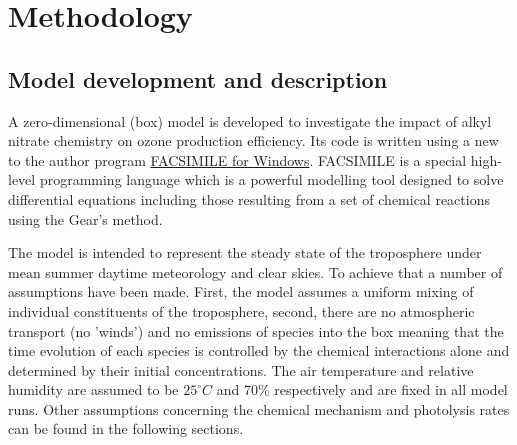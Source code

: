 \documentclass[11pt,a4paper]{article}
\begin{document}
\section{Methodology} \label{sec:method}
\subsection{Model development and description}\label{sec:method_develop}
A zero-dimensional (box) model is developed to investigate the impact of alkyl nitrate chemistry on ozone production efficiency. Its code is written using a new to the author program \href{http://www.mcpa-software.com/}{FACSIMILE for Windows}. FACSIMILE is a special high-level programming language which is a powerful modelling tool designed to solve differential equations including those resulting from a set of chemical reactions using the Gear’s method.

The model is intended to represent the steady state of the troposphere under mean summer daytime meteorology and clear skies. To achieve that a number of assumptions have been made. First, the model assumes a uniform mixing of individual constituents of the troposphere, second, there are no atmospheric transport (no 'winds') and no emissions of species into the box meaning that the time evolution of each species is controlled by the chemical interactions alone and determined by their initial concentrations. The air temperature and relative humidity are assumed to be $25^{\circ}C$ and 70\% respectively and are fixed in all model runs. Other assumptions concerning the chemical mechanism and photolysis rates can be found in the following sections.
\end{document}
